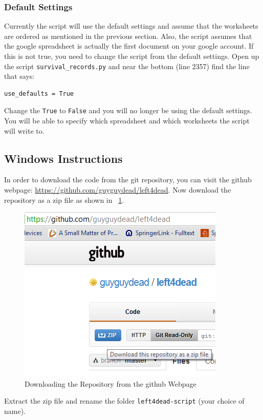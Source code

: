 \subsubsection{Default Settings}
Currently the script will use the default settings and assume that the worksheets are ordered as mentioned in the previous section. Also, the script assumes that the google spreadsheet is actually the first document on your google account. If this is not true, you need to change the script from the default settings. Open up the script \texttt{survival\_records.py} and near the bottom (line 2357) find the line that says:

\begin{lstlisting}
use_defaults = True
\end{lstlisting}

Change the \texttt{True} to \texttt{False} and you will no longer be using the default settings. You will be able to specify which spreadsheet and which worksheets the script will write to.
\subsection{Windows Instructions}
In order to download the code from the git repository, you can visit the github webpage: \url{https://github.com/guyguydead/left4dead}. Now download the repository as a zip file as shown in \figurename\ \ref{fig:download_repository}.
\begin{figure}[htb]
\centering
\includegraphics[width=0.40\columnwidth]{download_repository}
\caption{Downloading the Repository from the github Webpage}
\label{fig:download_repository}
\end{figure}
Extract the zip file and rename the folder \texttt{left4dead-script} (your choice of name).

